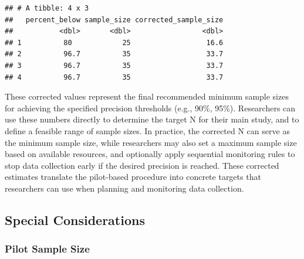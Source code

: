 \documentclass[
  man]{apa7}
\newenvironment{Shaded}{\begin{snugshade}}{\end{snugshade}}
\newcommand{\AttributeTok}[1]{\textcolor[rgb]{0.13,0.29,0.53}{#1}}
\newcommand{\CommentTok}[1]{\textcolor[rgb]{0.56,0.35,0.01}{\textit{#1}}}
\newcommand{\DecValTok}[1]{\textcolor[rgb]{0.00,0.00,0.81}{#1}}
\newcommand{\FunctionTok}[1]{\textcolor[rgb]{0.13,0.29,0.53}{\textbf{#1}}}
\newcommand{\NormalTok}[1]{#1}
\newcommand{\OtherTok}[1]{\textcolor[rgb]{0.56,0.35,0.01}{#1}}
\newcommand{\SpecialCharTok}[1]{\textcolor[rgb]{0.81,0.36,0.00}{\textbf{#1}}}
\begin{document}
\begin{Shaded}
\end{Shaded}

\begin{verbatim}
## # A tibble: 4 x 3
##   percent_below sample_size corrected_sample_size
##           <dbl>       <dbl>                 <dbl>
## 1          80            25                  16.6
## 2          96.7          35                  33.7
## 3          96.7          35                  33.7
## 4          96.7          35                  33.7
\end{verbatim}

These corrected values represent the final recommended minimum sample sizes for achieving the specified precision thresholds (e.g., 90\%, 95\%). Researchers can use these numbers directly to determine the target N for their main study, and to define a feasible range of sample sizes. In practice, the corrected N can serve as the minimum sample size, while researchers may also set a maximum sample size based on available resources, and optionally apply sequential monitoring rules to stop data collection early if the desired precision is reached. These corrected estimates translate the pilot-based procedure into concrete targets that researchers can use when planning and monitoring data collection.

\subsection{Special Considerations}\label{special-considerations}

\subsubsection{Pilot Sample Size}\label{pilot-sample-size}
\end{document}
